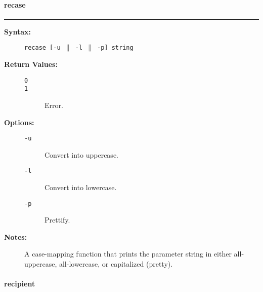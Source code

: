 \vspace {2pt}


\paragraph{recase}

\hrule
\begin{description}
\item[{\bf Syntax:}] \mbox{}

{\tt recase [-u $\|$ -l $\|$ -p] string}

\item[{\bf Return Values:}] \mbox{}

\begin{description}
\item[{\tt 0}] \mbox{}



\item[{\tt 1}] \mbox{}

Error.

\end{description}


\item[{\bf Options:}] \mbox{}

\begin{description}
\item[{\tt -u}] \mbox{}

Convert into uppercase.

\item[{\tt -l}] \mbox{}

Convert into lowercase.

\item[{\tt -p}] \mbox{}

Prettify.

\end{description}


\item[{\bf Notes:}] \mbox{}

A case-mapping function that prints the parameter 
string in either all-uppercase, all-lowercase, or capitalized (pretty).

\end{description}


\vspace {2pt}


\paragraph{recipient}

